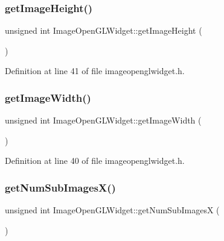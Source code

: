 \subsubsection{\texorpdfstring{getImageHeight()}{getImageHeight()}}
{\footnotesize\ttfamily unsigned int Image\+Open\+G\+L\+Widget\+::get\+Image\+Height (\begin{DoxyParamCaption}{ }\end{DoxyParamCaption})\hspace{0.3cm}{\ttfamily [inline]}}



Definition at line 41 of file imageopenglwidget.\+h.

\mbox{\label{class_image_open_g_l_widget_a7ebf129300faf2c55e168089131c9b01}} 
\subsubsection{\texorpdfstring{getImageWidth()}{getImageWidth()}}
{\footnotesize\ttfamily unsigned int Image\+Open\+G\+L\+Widget\+::get\+Image\+Width (\begin{DoxyParamCaption}{ }\end{DoxyParamCaption})\hspace{0.3cm}{\ttfamily [inline]}}



Definition at line 40 of file imageopenglwidget.\+h.

\mbox{\label{class_image_open_g_l_widget_a704677ac5ee71b767a5905ead14fdc1f}} 
\subsubsection{\texorpdfstring{getNumSubImagesX()}{getNumSubImagesX()}}
{\footnotesize\ttfamily unsigned int Image\+Open\+G\+L\+Widget\+::get\+Num\+Sub\+ImagesX (\begin{DoxyParamCaption}{ }\end{DoxyParamCaption})\hspace{0.3cm}{\ttfamily [inline]}}



